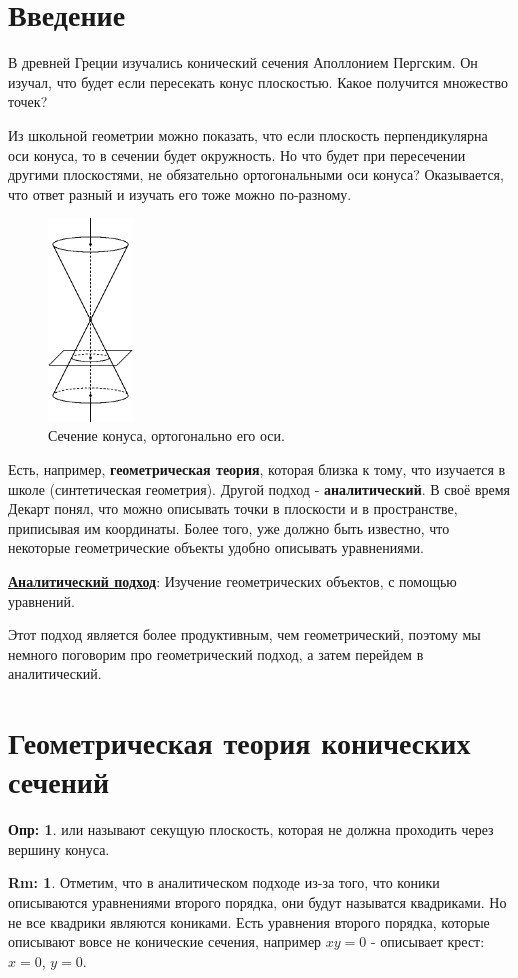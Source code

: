 \documentclass[12pt]{article}
\theoremstyle{definition}
\newtheorem{defn}{Опр:}
\newtheorem{rem}{Rm:}
\begin{document}
\section*{Введение}
В древней Греции изучались конический сечения Аполлонием Пергским. Он изучал, что будет если пересекать конус плоскостью. Какое получится множество точек? 

Из школьной геометрии можно показать, что если плоскость перпендикулярна оси конуса, то в сечении будет окружность. Но что будет при пересечении другими плоскостями, не обязательно ортогональными оси конуса? Оказывается, что ответ разный и изучать его тоже можно по-разному. 
\begin{figure}[H]
	\centering
	\includegraphics[width=0.20\textwidth]{ANGL1_1.eps}
	\caption{Сечение конуса, ортогонально его оси.}
	\label{1_1}
\end{figure}
Есть, например, \textbf{геометрическая теория}, которая близка к тому, что изучается в школе (синтетическая геометрия). Другой подход - \textbf{аналитический}. В своё время Декарт понял, что можно описывать точки в плоскости и в пространстве, приписывая им координаты. Более того, уже должно быть известно, что некоторые геометрические объекты удобно описывать уравнениями. 

\textbf{\uline{Аналитический подход}}: Изучение геометрических объектов, с помощью уравнений. 

Этот подход является более продуктивным, чем геометрический, поэтому мы немного поговорим про геометрический подход, а затем перейдем в аналитический.

\section*{Геометрическая теория конических сечений}
\begin{defn}
	 или  называют секущую плоскость, которая не должна проходить через вершину конуса.
\end{defn}
\begin{rem}
	Отметим, что в аналитическом подходе из-за того, что коники описываются уравнениями второго порядка, они будут называтся квадриками. Но не все квадрики являются кониками. Есть уравнения второго порядка, которые описывают вовсе не конические сечения, например $xy = 0$ - описывает крест: $x = 0, \, y = 0$.
\end{rem}
\end{document}
